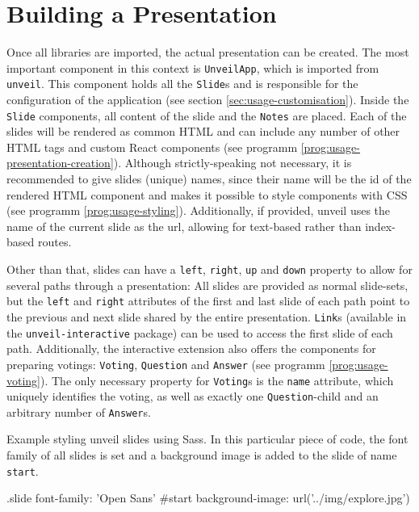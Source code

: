 \section{Building a Presentation}
\label{sec:usage-components}

Once all libraries are imported, the actual presentation can be created. The most important component in this context is \texttt{UnveilApp}, which is imported from \texttt{unveil}. This component holds all the \texttt{Slide}s and is responsible for the configuration of the application (see section \ref{sec:usage-customisation}). Inside the \texttt{Slide} components, all content of the slide and the \texttt{Notes} are placed. Each of the slides will be rendered as common HTML and can include any number of other HTML tags and custom React components (see programm \ref{prog:usage-presentation-creation}). Although strictly-speaking not necessary, it is recommended to give slides (unique) names, since their name will be the id of the rendered HTML component and makes it possible to style components with CSS (see programm \ref{prog:usage-styling}). Additionally, if provided, unveil uses the name of the current slide as the url, allowing for text-based rather than index-based routes.

Other than that, slides can have a \texttt{left}, \texttt{right}, \texttt{up} and \texttt{down} property to allow for several paths through a presentation: All slides are provided as normal slide-sets, but the \texttt{left} and \texttt{right} attributes of the first and last slide of each path point to the previous and next slide shared by the entire presentation. \texttt{Link}s (available in the \texttt{unveil-interactive} package) can be used to access the first slide of each path. Additionally, the interactive extension also offers the components for preparing votings: \texttt{Voting}, \texttt{Question} and \texttt{Answer} (see programm \ref{prog:usage-voting}). The only necessary property for \texttt{Voting}s is the \texttt{name} attribute, which uniquely identifies the voting, as well as exactly one \texttt{Question}-child and an arbitrary number of \texttt{Answer}s.

\begin{program}
\caption{Example styling unveil slides using Sass. In this particular piece of code, the font family of all slides is set and a background image is added to the slide of name \texttt{start}.}
\label{prog:usage-styling}
\begin{CssCode}
  .slide
    font-family: 'Open Sans'
  #start
    background-image: url('../img/explore.jpg')
\end{CssCode}
\end{program}

